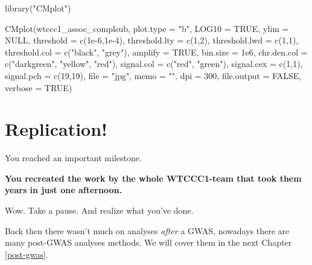 \documentclass[
]{book}
\newenvironment{Shaded}{\begin{snugshade}}{\end{snugshade}}
\newcommand{\AttributeTok}[1]{\textcolor[rgb]{0.77,0.63,0.00}{#1}}
\newcommand{\ConstantTok}[1]{\textcolor[rgb]{0.00,0.00,0.00}{#1}}
\newcommand{\DecValTok}[1]{\textcolor[rgb]{0.00,0.00,0.81}{#1}}
\newcommand{\FloatTok}[1]{\textcolor[rgb]{0.00,0.00,0.81}{#1}}
\newcommand{\FunctionTok}[1]{\textcolor[rgb]{0.00,0.00,0.00}{#1}}
\newcommand{\NormalTok}[1]{#1}
\newcommand{\StringTok}[1]{\textcolor[rgb]{0.31,0.60,0.02}{#1}}
\begin{document}
\begin{Shaded}
\begin{Highlighting}[]
\FunctionTok{library}\NormalTok{(}\StringTok{"CMplot"}\NormalTok{)}

\FunctionTok{CMplot}\NormalTok{(wtccc1\_assoc\_complsub,}
       \AttributeTok{plot.type =} \StringTok{"b"}\NormalTok{, }\AttributeTok{LOG10 =} \ConstantTok{TRUE}\NormalTok{, }\AttributeTok{ylim =} \ConstantTok{NULL}\NormalTok{,}
       \AttributeTok{threshold =} \FunctionTok{c}\NormalTok{(}\FloatTok{1e{-}6}\NormalTok{,}\FloatTok{1e{-}4}\NormalTok{), }\AttributeTok{threshold.lty =} \FunctionTok{c}\NormalTok{(}\DecValTok{1}\NormalTok{,}\DecValTok{2}\NormalTok{), }\AttributeTok{threshold.lwd =} \FunctionTok{c}\NormalTok{(}\DecValTok{1}\NormalTok{,}\DecValTok{1}\NormalTok{), }\AttributeTok{threshold.col =} \FunctionTok{c}\NormalTok{(}\StringTok{"black"}\NormalTok{, }\StringTok{"grey"}\NormalTok{),}
       \AttributeTok{amplify =} \ConstantTok{TRUE}\NormalTok{,}
       \AttributeTok{bin.size =} \FloatTok{1e6}\NormalTok{, }\AttributeTok{chr.den.col =} \FunctionTok{c}\NormalTok{(}\StringTok{"darkgreen"}\NormalTok{, }\StringTok{"yellow"}\NormalTok{, }\StringTok{"red"}\NormalTok{),}
       \AttributeTok{signal.col =} \FunctionTok{c}\NormalTok{(}\StringTok{"red"}\NormalTok{, }\StringTok{"green"}\NormalTok{), }\AttributeTok{signal.cex =} \FunctionTok{c}\NormalTok{(}\DecValTok{1}\NormalTok{,}\DecValTok{1}\NormalTok{), }\AttributeTok{signal.pch =} \FunctionTok{c}\NormalTok{(}\DecValTok{19}\NormalTok{,}\DecValTok{19}\NormalTok{),}
       \AttributeTok{file =} \StringTok{"jpg"}\NormalTok{, }\AttributeTok{memo =} \StringTok{""}\NormalTok{, }\AttributeTok{dpi =} \DecValTok{300}\NormalTok{, }\AttributeTok{file.output =} \ConstantTok{FALSE}\NormalTok{, }\AttributeTok{verbose =} \ConstantTok{TRUE}\NormalTok{)}
\end{Highlighting}
\end{Shaded}

\hypertarget{replication}{%
\section{Replication!}\label{replication}}

You reached an important milestone.

\textbf{You recreated the work by the whole WTCCC1-team that took them years in just one afternoon.}

Wow. Take a pause. And realize what you've done.

Back then there wasn't much on analyses \emph{after} a GWAS, nowadays there are many post-GWAS analyses methods. We will cover them in the next Chapter \ref{post-gwas}.
\end{document}
